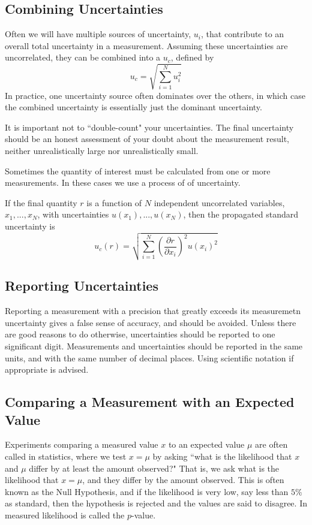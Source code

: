 \documentclass[12pt, a4paper, oneside, openright, titlepage]{book}
\begin{document}
\begin{appendices}
    \subsection{Combining Uncertainties}

    Often we will have multiple sources of uncertainty, $u_i$, that contribute to an overall total uncertainty in a measurement. Assuming these uncertainties are uncorrelated, they can be combined into a  $u_c$, defined by $$u_c = \sqrt{\sum_{i=1}^Nu_i^2}$$
    In practice, one uncertainty source often dominates over the others, in which case the combined uncertainty is essentially just the dominant uncertainty.

    It is important not to ``double-count" your uncertainties. The final uncertainty should be an honest assessment of your doubt about the measurement result, neither unrealistically large nor unrealistically small.

    Sometimes the quantity of interest must be calculated from one or more measurements. In these cases we use a process of  of uncertainty.

    \begin{defn}
        If the final quantity $r$ is a function of $N$ independent uncorrelated variables, $x_1,...,x_N$, with uncertainties $u(x_1),...,u(x_N)$, then the propagated standard uncertainty is $$u_c(r) = \sqrt{\sum_{i=1}^N\left(\frac{\partial r}{\partial x_i}\right)^2u(x_i)^2}$$
    \end{defn}

    \subsection{Reporting Uncertainties}

    Reporting a measurement with a precision that greatly exceeds its measuremetn uncertainty gives a false sense of accuracy, and should be avoided. Unless there are good reasons to do otherwise, uncertainties should be reported to one significant digit. Measurements and uncertainties should be reported in the same units, and with the same number of decimal places. Using scientific notation if appropriate is advised.

    \subsection{Comparing a Measurement with an Expected Value}

    Experiments comparing a measured value $x$ to an expected value $\mu$ are often called  in statistics, where we test $x = \mu$ by asking ``what is the likelihood that $x$ and $\mu$ differ by at least the amount observed?" That is, we ask what is the likelihood that $x = \mu$, and they differ by the amount observed. This is often known as the Null Hypothesis, and if the likelihood is very low, say less than $5\%$ as standard, then the hypothesis is rejected and the values are said to disagree. In measured likelihood is called the $p$-value.


\end{appendices}
\end{document}
